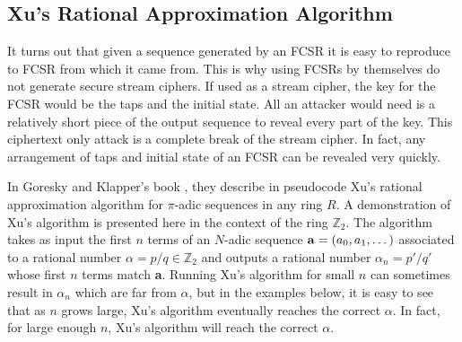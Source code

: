 \documentclass[english]{article}
\def\zzz{\mathbb{Z}}
\theoremstyle{plain}
\theoremstyle{definition}
\theoremstyle{remark}
\begin{document}
\subsection{Xu's Rational Approximation Algorithm}
\par It turns out that given a sequence generated by an FCSR it is easy to
reproduce to FCSR from which it came from. This is why using FCSRs by themselves
do not generate secure stream ciphers. If used as a stream cipher, the key for
the FCSR would be the taps and the initial state. All an attacker would need is
a relatively short piece of the output sequence to reveal every part of the key.
This ciphertext only attack is a complete break of the stream cipher. In fact, any
arrangement of taps and initial state of an FCSR can be revealed very quickly.
\par In Goresky and Klapper's book \cite{bk:gk12}, they describe in pseudocode Xu's rational
approximation algorithm for $\pi$-adic sequences in any ring $R$. A
demonstration of Xu's algorithm is presented here in the context of the ring
$\zzz_2$. The algorithm takes as input the first $n$ terms
of an $N$-adic sequence ${\bf a}=(a_0,a_1,\dots)$ associated to a rational
number $\alpha=p/q\in\zzz_2$ and outputs a rational number $\alpha_n=p'/q'$
whose first $n$ terms match
{\bf a}. Running Xu's algorithm for small $n$ can sometimes result in $\alpha_n$
which are far from $\alpha$, but in the examples below, it is easy to see that as
$n$ grows large, Xu's algorithm eventually reaches the correct $\alpha$. In
fact, for large enough $n$, Xu's algorithm will reach the correct $\alpha$.
\end{document}
